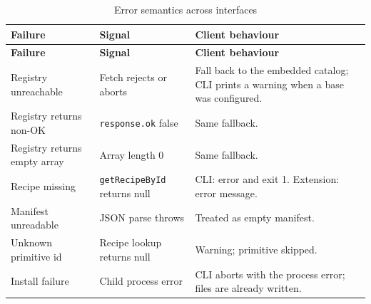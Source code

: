 \begin{longtable}{@{}L{4.4cm}L{3.4cm}L{6.4cm}@{}}
\caption{Error semantics across interfaces}\\
\toprule
\textbf{Failure} & \textbf{Signal} & \textbf{Client behaviour} \\
\midrule
\endfirsthead
\toprule
\textbf{Failure} & \textbf{Signal} & \textbf{Client behaviour} \\
\midrule
\endhead
Registry unreachable & Fetch rejects or aborts & Fall back to the embedded catalog;
CLI prints a warning when a base was configured. \\
Registry returns non-OK & \texttt{response.ok} false & Same fallback. \\
Registry returns empty array & Array length 0 & Same fallback. \\
Recipe missing & \texttt{getRecipeById} returns null & CLI: error and exit 1.
Extension: error message. \\
Manifest unreadable & JSON parse throws & Treated as empty manifest. \\
Unknown primitive id & Recipe lookup returns null & Warning; primitive skipped. \\
Install failure & Child process error & CLI aborts with the process error; files
are already written. \\
\bottomrule
\end{longtable}

